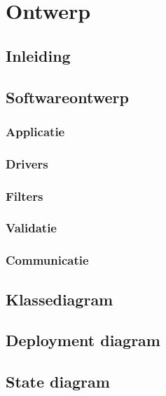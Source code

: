 \chapter{Ontwerp}
\section{Inleiding}


\section{Softwareontwerp}
\subsection{Applicatie}

\subsection{Drivers}

\subsection{Filters}

\subsection{Validatie}

\subsection{Communicatie}

\section{Klassediagram}

\section{Deployment diagram}

\section{State diagram}